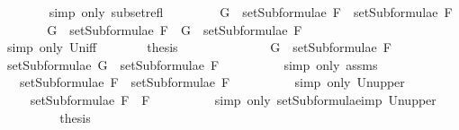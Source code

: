 \begin{isabellebody}
\ \ \ \ \ \ \isamarkupfalse%
\ {\isacharparenleft}simp\ only{\isacharcolon}\ subset{\isacharunderscore}refl{\isacharparenright}\isanewline
\ \ \isamarkupfalse%
\isanewline
\ \ \ \ \isamarkupfalse%
\ {\isachardoublequoteopen}G\ {\isasymin}\ setSubformulae\ F{}\ {\isasymunion}\ setSubformulae\ F{}{\isachardoublequoteclose}\isanewline
\ \ \ \ \isamarkupfalse%
\ \isamarkupfalse%
\ {\isachardoublequoteopen}G\ {\isasymin}\ setSubformulae\ F{}\ {\isasymor}\ G\ {\isasymin}\ setSubformulae\ F{}{\isachardoublequoteclose}\ \ \isanewline
\ \ \ \ \ \ \isamarkupfalse%
\ {\isacharparenleft}simp\ only{\isacharcolon}\ Un{\isacharunderscore}iff{\isacharparenright}\isanewline
\ \ \ \ \isamarkupfalse%
\ \isamarkupfalse%
\ {\isacharquery}thesis\isanewline
\ \ \ \ \isamarkupfalse%
\ \isanewline
\ \ \ \ \ \ \isamarkupfalse%
\ {\isachardoublequoteopen}G\ {\isasymin}\ setSubformulae\ F{}{\isachardoublequoteclose}\isanewline
\ \ \ \ \ \ \isamarkupfalse%
\ \isamarkupfalse%
\ {\isachardoublequoteopen}setSubformulae\ G\ {\isasymsubseteq}\ setSubformulae\ F{}{\isachardoublequoteclose}\isanewline
\ \ \ \ \ \ \ \ \isamarkupfalse%
\ {\isacharparenleft}simp\ only{\isacharcolon}\ assms{\isacharparenleft}{}{\isacharparenright}{\isacharparenright}\isanewline
\ \ \ \ \ \ \isamarkupfalse%
\ \isamarkupfalse%
\ {\isachardoublequoteopen}{\isasymdots}\ {\isasymsubseteq}\ setSubformulae\ F{}\ {\isasymunion}\ setSubformulae\ F{}{\isachardoublequoteclose}\isanewline
\ \ \ \ \ \ \ \ \isamarkupfalse%
\ {\isacharparenleft}simp\ only{\isacharcolon}\ Un{\isacharunderscore}upper{}{\isacharparenright}\isanewline
\ \ \ \ \ \ \isamarkupfalse%
\ \isamarkupfalse%
\ {\isachardoublequoteopen}{\isasymdots}\ {\isasymsubseteq}\ setSubformulae\ {\isacharparenleft}F{}\ \isactrlbold {\isasymrightarrow}\ F{}{\isacharparenright}{\isachardoublequoteclose}\isanewline
\ \ \ \ \ \ \ \ \isamarkupfalse%
\ {\isacharparenleft}simp\ only{\isacharcolon}\ setSubformulae{\isacharunderscore}imp\ Un{\isacharunderscore}upper{}{\isacharparenright}\isanewline
\ \ \ \ \ \ \isamarkupfalse%
\ \isamarkupfalse%
\ {\isacharquery}thesis\isanewline

\end{isabellebody}
